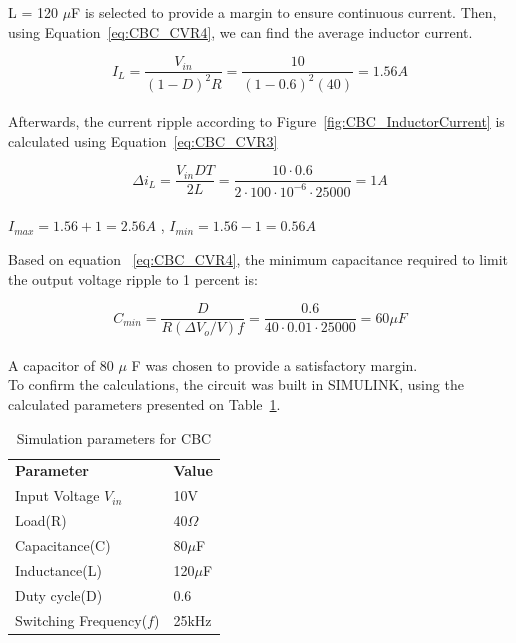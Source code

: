 L = 120 $\mu$F is selected to provide a margin to ensure continuous current.
Then, using Equation~\ref{eq:CBC_CVR4}, we can find the average inductor current.

\begin{equation}
I_L = \frac{V_{in}}{(1-D)^2R} = \frac{10}{(1-0.6)^2(40)} = 1.56 A
\end{equation}\\
Afterwards, the current ripple according to Figure~\ref{fig:CBC_InductorCurrent} is calculated using Equation~\ref{eq:CBC_CVR3}

\begin{equation}
\Delta i_L = \frac{V_{in}DT}{2L} = \frac{10\cdot 0.6}{2\cdot 100\cdot 10^{-6}\cdot 25000} = 1 A
\end{equation}\\
$I_{max} = 1.56 + 1 = 2.56 A$ , 
$I_{min} = 1.56 - 1 = 0.56 A$


Based on equation ~\ref{eq:CBC_CVR4}, the minimum capacitance required to limit the output voltage ripple to 1 percent is:

\begin{equation}
C_{min} = \frac{D}{R(\Delta V_o/V)f} = \frac{0.6}{40\cdot 0.01\cdot 25000 } = 60\mu F
\end{equation}\\
A capacitor of 80 $\mu$ F was chosen to provide a satisfactory margin.\\

To confirm the calculations, the circuit was built in SIMULINK, using the calculated parameters presented on Table~\ref{tab:CBC}.

\begin{table}[H]
\begin{center}
\caption {Simulation parameters for CBC} \label{tab:CBC} 
\begin{tabular}{|l|l|}
\cline{1-2}
\textbf{Parameter} & \textbf{Value}  \\ \cline{1-2}
Input Voltage $V_{in}$          &      10V   \\ \cline{1-2}
Load(R)   & 40$\Omega$           \\ \cline{1-2}
Capacitance(C)          &       80$\mu$F     \\ \cline{1-2}
Inductance(L)          &      120$\mu$F      \\ \cline{1-2}
Duty cycle(D)          &     0.6       \\ \cline{1-2}
Switching Frequency($f$)          &      25kHz      \\ \cline{1-2}
\end{tabular}
\end{center}
\end{table}


